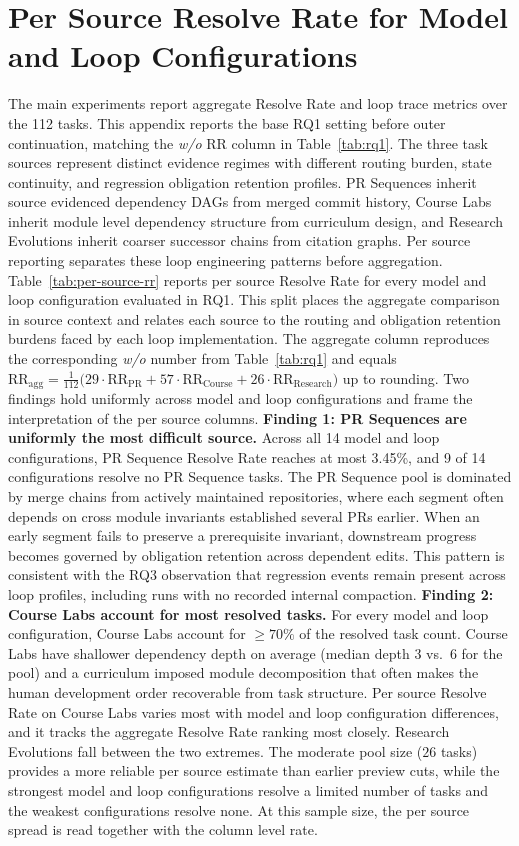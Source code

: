 \section{Per Source Resolve Rate for Model and Loop Configurations}\label{app:per-source}

The main experiments report aggregate Resolve Rate and loop trace metrics over the 112 \lhb{} tasks. This appendix reports the base RQ1 setting before outer continuation, matching the \textit{w/o} RR column in Table~\ref{tab:rq1}. The three task sources represent distinct evidence regimes with different routing burden, state continuity, and regression obligation retention profiles. PR Sequences inherit source evidenced dependency DAGs from merged commit history, Course Labs inherit module level dependency structure from curriculum design, and Research Evolutions inherit coarser successor chains from citation graphs. Per source reporting separates these loop engineering patterns before aggregation.
Table~\ref{tab:per-source-rr} reports per source Resolve Rate for every model and loop configuration evaluated in RQ1. This split places the aggregate comparison in source context and relates each source to the routing and obligation retention burdens faced by each loop implementation. The aggregate column reproduces the corresponding \textit{w/o} number from Table~\ref{tab:rq1} and equals $\text{RR}_{\text{agg}} = \tfrac{1}{112}\big(29\cdot\text{RR}_{\text{PR}} + 57\cdot\text{RR}_{\text{Course}} + 26\cdot\text{RR}_{\text{Research}}\big)$ up to rounding.
Two findings hold uniformly across model and loop configurations and frame the interpretation of the per source columns.
\textbf{Finding 1: PR Sequences are uniformly the most difficult source.}
Across all 14 model and loop configurations, PR Sequence Resolve Rate reaches at most 3.45\%, and 9 of 14 configurations resolve no PR Sequence tasks. The PR Sequence pool is dominated by merge chains from actively maintained repositories, where each segment often depends on cross module invariants established several PRs earlier. When an early segment fails to preserve a prerequisite invariant, downstream progress becomes governed by obligation retention across dependent edits. This pattern is consistent with the RQ3 observation that regression events remain present across loop profiles, including runs with no recorded internal compaction.
\textbf{Finding 2: Course Labs account for most resolved tasks.}
For every model and loop configuration, Course Labs account for $\geq 70\%$ of the resolved task count. Course Labs have shallower dependency depth on average (median depth $3$ vs.\ $6$ for the pool) and a curriculum imposed module decomposition that often makes the human development order recoverable from task structure. Per source Resolve Rate on Course Labs varies most with model and loop configuration differences, and it tracks the aggregate Resolve Rate ranking most closely.
Research Evolutions fall between the two extremes. The moderate pool size ($26$ tasks) provides a more reliable per source estimate than earlier preview cuts, while the strongest model and loop configurations resolve a limited number of tasks and the weakest configurations resolve none. At this sample size, the per source spread is read together with the column level rate.

